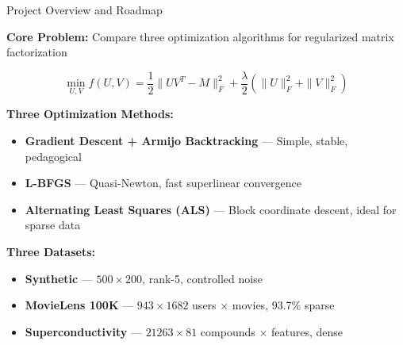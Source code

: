 \documentclass[aspectratio=169,usenames,dvipsnames]{beamer}
\begin{document}
\begin{frame}{Project Overview and Roadmap}
    
    \textbf{Core Problem:} Compare three optimization algorithms for regularized matrix factorization
    
    \vspace{0.2cm}
    
    $$\min_{U, V} f(U, V) = \frac{1}{2}\|UV^T - M\|_F^2 + \frac{\lambda}{2}(\|U\|_F^2 + \|V\|_F^2)$$
    
    \vspace{0.4cm}
    
    \textbf{Three Optimization Methods:}
    \begin{itemize}
        \item \textcolor{emoryblue}{\textbf{Gradient Descent + Armijo Backtracking}} --- Simple, stable, pedagogical
        \item \textcolor{emoryblue}{\textbf{L-BFGS}} --- Quasi-Newton, fast superlinear convergence
        \item \textcolor{emoryblue}{\textbf{Alternating Least Squares (ALS)}} --- Block coordinate descent, ideal for sparse data
    \end{itemize}
    
    \vspace{0.4cm}
    
    \textbf{Three Datasets:}
    \begin{itemize}
        \item \textcolor{emoryblue}{\textbf{Synthetic}} --- $500 \times 200$, rank-5, controlled noise
        \item \textcolor{emoryblue}{\textbf{MovieLens 100K}} --- $943 \times 1682$ users $\times$ movies, 93.7\% sparse
        \item \textcolor{emoryblue}{\textbf{Superconductivity}} --- $21263 \times 81$ compounds $\times$ features, dense
    \end{itemize}
\end{frame}
\end{document}
